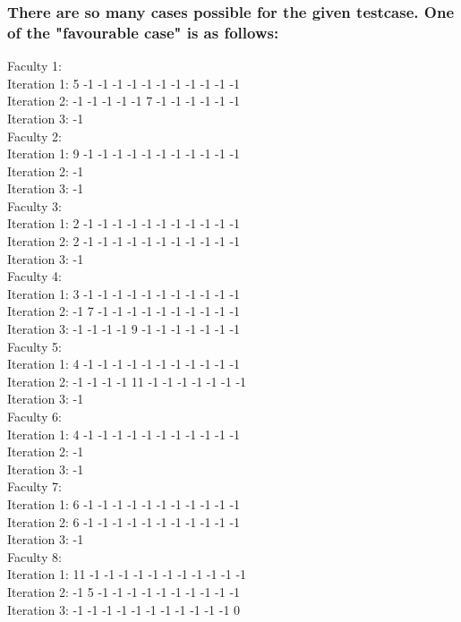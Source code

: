 \documentclass{article}
\begin{document}
\subsubsection{There are so many cases possible for the given testcase. One of the "favourable case" is as follows:}
Faculty 1: \\
Iteration 1: 5 -1 -1 -1 -1 -1 -1 -1 -1 -1 -1 -1 \\
Iteration 2: -1 -1 -1 -1 -1 7 -1 -1 -1 -1 -1 -1 \\
Iteration 3: -1\\
Faculty 2: \\
Iteration 1: 9 -1 -1 -1 -1 -1 -1 -1 -1 -1 -1 -1\\ 
Iteration 2: -1\\
Iteration 3: -1\\
Faculty 3: \\
Iteration 1: 2 -1 -1 -1 -1 -1 -1 -1 -1 -1 -1 -1\\ 
Iteration 2: 2 -1 -1 -1 -1 -1 -1 -1 -1 -1 -1 -1 \\
Iteration 3: -1\\
Faculty 4: \\
Iteration 1: 3 -1 -1 -1 -1 -1 -1 -1 -1 -1 -1 -1\\ 
Iteration 2: -1 7 -1 -1 -1 -1 -1 -1 -1 -1 -1 -1 \\
Iteration 3: -1 -1 -1 -1 9 -1 -1 -1 -1 -1 -1 -1 \\
Faculty 5: \\
Iteration 1: 4 -1 -1 -1 -1 -1 -1 -1 -1 -1 -1 -1 \\
Iteration 2: -1 -1 -1 -1 11 -1 -1 -1 -1 -1 -1 -1\\ 
Iteration 3: -1\\
Faculty 6: \\
Iteration 1: 4 -1 -1 -1 -1 -1 -1 -1 -1 -1 -1 -1 \\
Iteration 2: -1\\
Iteration 3: -1\\
Faculty 7: \\
Iteration 1: 6 -1 -1 -1 -1 -1 -1 -1 -1 -1 -1 -1\\ 
Iteration 2: 6 -1 -1 -1 -1 -1 -1 -1 -1 -1 -1 -1 \\
Iteration 3: -1\\
Faculty 8: \\
Iteration 1: 11 -1 -1 -1 -1 -1 -1 -1 -1 -1 -1 -1\\ 
Iteration 2: -1 5 -1 -1 -1 -1 -1 -1 -1 -1 -1 -1 \\
Iteration 3: -1 -1 -1 -1 -1 -1 -1 -1 -1 -1 -1 0 \\
\end{document}

